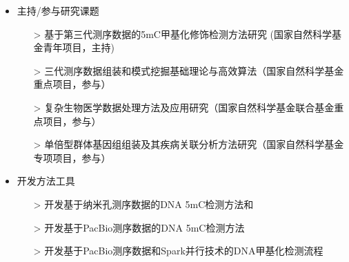 \documentclass[zh]{resume}
\begin{document}
\begin{itemize}
  \item 主持/参与研究课题
  \begin{itemize}
    \item[>] 基于第三代测序数据的5mC甲基化修饰检测方法研究 (国家自然科学基金青年项目，主持)
    \item[>] 三代测序数据组装和模式挖掘基础理论与高效算法（国家自然科学基金重点项目，参与）
    \item[>] 复杂生物医学数据处理方法及应用研究（国家自然科学基金联合基金重点项目，参与）
    \item[>] 单倍型群体基因组组装及其疾病关联分析方法研究（国家自然科学基金专项项目，参与）
  \end{itemize}
  \item 开发方法工具
  \begin{itemize}
    \item[>] 开发基于纳米孔测序数据的DNA 5mC检测方法和
    \item[>] 开发基于PacBio测序数据的DNA 5mC检测方法
    \item[>] 开发基于PacBio测序数据和Spark并行技术的DNA甲基化检测流程
  \end{itemize}
\end{itemize}
\end{document}
